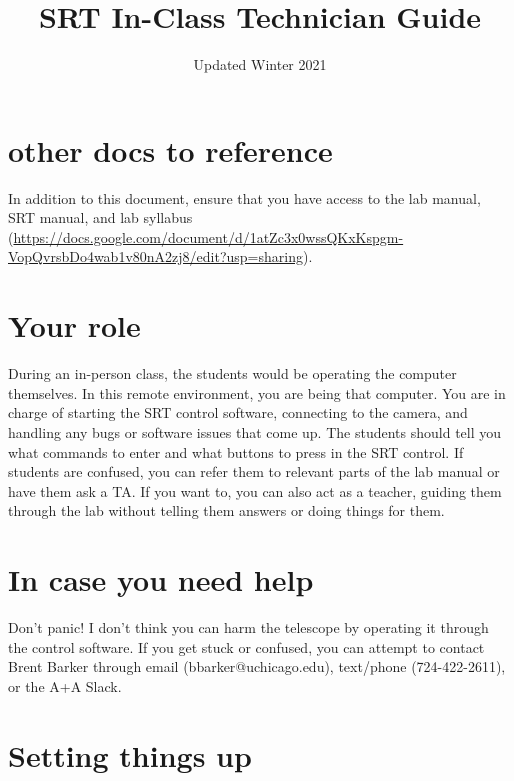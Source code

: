 \documentclass{article}
\title{SRT In-Class Technician Guide}
\date{Updated Winter 2021}
\begin{document}
	\maketitle
	
\section{other docs to reference}
	
	In addition to this document, ensure that you have access to the lab manual, SRT manual, and lab syllabus (\url{https://docs.google.com/document/d/1atZc3x0wssQKxKspgm-VopQvrsbDo4wab1v80nA2zj8/edit?usp=sharing}).
\section{Your role}
	
	During an in-person class, the students would be operating the computer themselves. In this remote environment, you are being that computer. You are in charge of starting the SRT control software, connecting to the camera, and handling any bugs or software issues that come up. The students should tell you what commands to enter and what buttons to press in the SRT control. If students are confused, you can refer them to relevant parts of the lab manual or have them ask a TA. If you want to, you can also act as a teacher, guiding them through the lab without telling them answers or doing things for them.
	
\section{In case you need help}

Don't panic! I don't think you can harm the telescope by operating it through the control software. If you get stuck or confused, you can attempt to contact Brent Barker through email (bbarker@uchicago.edu), text/phone (724-422-2611), or the A+A Slack.

\section{Setting things up}
\end{document}
